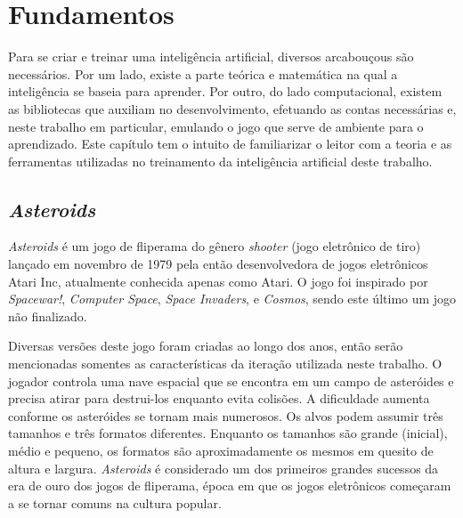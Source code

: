 \chapter{Fundamentos}
\label{cap:fundamentos}

Para se criar e treinar uma inteligência artificial, diversos arcabouçous são necessários. Por um lado, existe a parte teórica e matemática na qual a inteligência se baseia para aprender. Por outro, do lado computacional, existem as bibliotecas que auxiliam no desenvolvimento, efetuando as contas necessárias e, neste trabalho em particular, emulando o jogo que serve de ambiente para o aprendizado.
Este capítulo tem o intuito de familiarizar o leitor com a teoria e as ferramentas utilizadas no treinamento da inteligência artificial deste trabalho.

\section{\textit{Asteroids}}
\label{sec:asteroids}

\textit{Asteroids} é um jogo de fliperama do gênero \textit{shooter} (jogo eletrônico de tiro) lançado em novembro de 1979 pela então desenvolvedora de jogos eletrônicos Atari Inc, atualmente conhecida apenas como Atari. O jogo foi inspirado por \textit{Spacewar!}, \textit{Computer Space}, \textit{Space Invaders}, e \textit{Cosmos}, sendo este último um jogo não finalizado.

Diversas versões deste jogo foram criadas ao longo dos anos, então serão mencionadas somentes as características da iteração utilizada neste trabalho.
O jogador controla uma nave espacial que se encontra em um campo de asteróides e precisa atirar para destrui-los enquanto evita colisões. A dificuldade aumenta conforme os asteróides se tornam mais numerosos. Os alvos podem assumir três tamanhos e três formatos diferentes. Enquanto os tamanhos são grande (inicial), médio e pequeno, os formatos são aproximadamente os mesmos em quesito de altura e largura.
\textit{Asteroids} é considerado um dos primeiros grandes sucessos da era de ouro dos jogos de fliperama, época em que os jogos eletrônicos começaram a se tornar comuns na cultura popular. 

